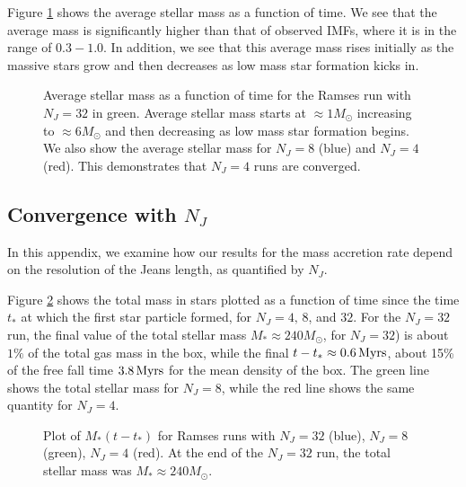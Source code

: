 \documentclass[../dissertation.tex]{subfiles}
\begin{document}
Figure \ref{fig:hydro_avg_mass} shows the average stellar mass as a function of time. We see that the average mass is significantly higher than that of observed IMFs, where it is in the range of $0.3 - 1.0$. In addition, we see that this average mass rises initially as the massive stars grow and then decreases as low mass star formation kicks in.

\begin{figure}[htb]
\caption[Hydro Average Stellar Mass as a function of time since the first star formed]{Average stellar mass as a function of time for the Ramses run with $N_J = 32$ in green. Average stellar mass starts at $\approx 1 M_\odot$ increasing to $\approx 6 M_\odot$ and then decreasing as low mass star formation begins. We also show the average stellar mass for $N_J = 8$ (blue) and $N_J = 4$ (red). This demonstrates that $N_J = 4$ runs are converged. \label{fig:hydro_avg_mass}}
\end{figure}

\subsection{Convergence with $N_J$}

In this appendix, we examine how our results for the mass accretion rate depend on the resolution of the Jeans length, as quantified by $N_J$. 

Figure \ref{fig:hydro_Convergence} shows the total mass in stars plotted as a function of time since the time $t_*$ at which the first star particle formed, for $N_J=4,\,8$, and $32$.
For the $N_J=32$ run, the final value of the total stellar mass $M_*\approx 240M_\odot$, for $N_J =32$) 
is about $1\%$ of the total gas mass in the box, while the final $t-t_*\approx 0.6\,\rm Myrs$, 
about 15\% of the free fall time $3.8\,\rm Myrs$ for the mean density of the box. 
The green line shows the total stellar mass for $N_J = 8$, while the red line shows the same quantity for $N_J = 4$.

\begin{figure}[htb]
\caption[Hydro Convergence in Jeans Length]{Plot of $M_*(t-t_*)$ for Ramses runs with $N_J = 32$ (blue), $N_J = 8$ (green), $N_J = 4$ (red). At the end of the $N_J = 32$ run, the total stellar mass was $M_*\approx 240M_\odot$. \label{fig:hydro_Convergence}}
\end{figure}
\end{document}
